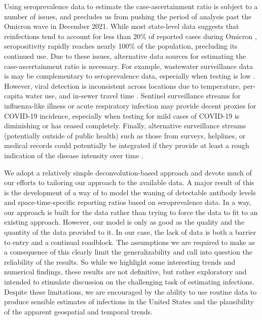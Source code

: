 \documentclass{article}
\begin{document}
Using seroprevalence data to estimate the case-ascertainment ratio is subject to
a number of issues, and precludes us from pushing the period of analysis past
the Omicron wave in December 2021. While most state-level data suggests that
reinfections tend to account for less than 20\% of reported cases during Omicron
\citep{ruff2022rapid, nyreinfect2021, hireinfect2022, wareinfect2022}, seropositivity rapidly reaches nearly 100\% of the population,
precluding its continued use. Due to these issues,
alternative data sources for
estimating the case-ascertainment ratio is necessary. 
For example, wastewater surveillance data
is may be complementary to seroprevalence data,
especially when testing is low \citep{mcmanus2023predicting}. However, 
viral detection is inconsistent across locations due to temperature,
per-capita water use, and in-sewer travel time \citep{mcmanus2023predicting,
hart2020computational, li2023correlation}. Sentinel surveillance streams for
influenza-like illness or acute respiratory infection may provide decent proxies
for COVID-19 incidence, especially when testing for mild cases of COVID-19 is
diminishing or has ceased completely. Finally, alternative surveillance streams
(potentially outside of public health) such as those from surveys, helplines, or
medical records could potentially be integrated if they provide at least a rough
indication of the disease intensity over time
\citep{reinhart2021open, ecdc2020strategies}.

We adopt a relatively simple deconvolution-based approach and devote
much of our efforts to tailoring our approach to the available data. A major
result of this is the development of a way of to model the waning of detectable
antibody levels and space-time-specific reporting ratios based on seroprevalence
data. In a way, our approach is built for the data rather than trying to force
the data to fit to an existing approach. However, our model is only as good as
the quality and the quantity of the data provided to it. In our case, the lack
of data is both a barrier to entry and a continual roadblock. The assumptions we
are required to make as a consequence of this clearly limit the generalizability
and call into question the reliability of the results. So while we highlight
some interesting trends and numerical findings, these results are not
definitive, but rather exploratory and intended to stimulate discussion on the
challenging task of estimating infections. Despite these limitations, we are
encouraged by the ability to use routine data to produce sensible estimates of
infections in the United States and the plausibility of the apparent geospatial
and temporal trends. 
\end{document}
